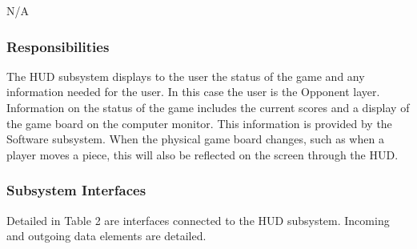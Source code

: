 N/A

\subsubsection{Responsibilities}
The HUD subsystem displays to the user the status of the game and any information needed for the user. In this case the user is the Opponent layer. Information on the status of the game includes the current scores and a display of the game board on the computer monitor. This information is provided by the Software subsystem. When the physical game board changes, such as when a player moves a piece, this will also be reflected on the screen through the HUD.

\subsubsection{Subsystem Interfaces}


Detailed in Table 2 are interfaces connected to the HUD subsystem. Incoming and outgoing data elements are detailed.

